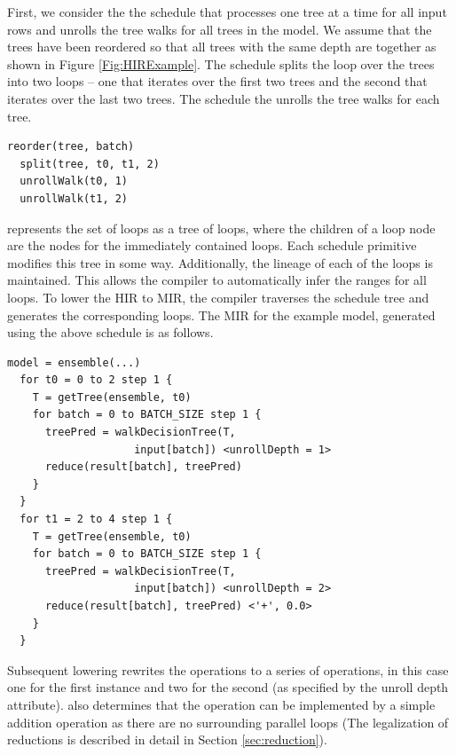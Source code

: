 First, we consider the the schedule that processes one tree at a time 
for all input rows and unrolls the tree walks for all trees in the model. 
We assume that the trees have been reordered so that all trees with 
the same depth are together as shown in Figure \ref{Fig:HIRExample}.
The schedule splits the loop over the trees into two loops -- one that
iterates over the first two trees and the second that iterates over the
last two trees. The schedule the unrolls the tree walks for each tree.
\begin{lstlisting}[style=c++]
  reorder(tree, batch)  
  split(tree, t0, t1, 2)
  unrollWalk(t0, 1)
  unrollWalk(t1, 2)
\end{lstlisting}

\Treebeard{} represents the set of loops as a tree of loops, where the children 
of a loop node are the nodes for the immediately contained loops. Each schedule 
primitive modifies this tree in some way. Additionally,
the lineage of each of the loops is maintained. This allows 
the compiler to automatically infer the ranges for all loops. To lower the
HIR to MIR, the compiler traverses the schedule tree and generates the
corresponding loops. The MIR for the example model, generated using the above   
schedule is as follows. 
\begin{lstlisting}[style=c++]
  model = ensemble(...)
  for t0 = 0 to 2 step 1 {
    T = getTree(ensemble, t0)
    for batch = 0 to BATCH_SIZE step 1 {
      treePred = walkDecisionTree(T, 
                    input[batch]) <unrollDepth = 1>
      reduce(result[batch], treePred)
    }
  }
  for t1 = 2 to 4 step 1 {
    T = getTree(ensemble, t0)
    for batch = 0 to BATCH_SIZE step 1 {
      treePred = walkDecisionTree(T,
                    input[batch]) <unrollDepth = 2>
      reduce(result[batch], treePred) <'+', 0.0>
    }
  }
\end{lstlisting}
Subsequent lowering rewrites the  operations to a 
series of  operations, in this case one for the 
first instance and two for the second (as specified by the unroll depth
attribute). \Treebeard{} also determines that the  operation
can be implemented by a simple addition operation as there are no 
surrounding parallel loops (The legalization of reductions is described 
in detail in Section \ref{sec:reduction}).

